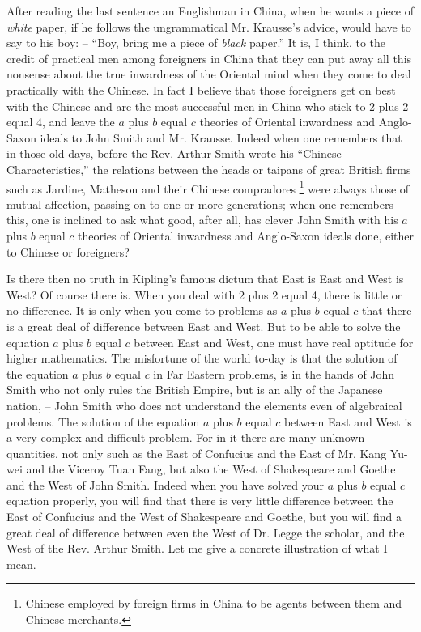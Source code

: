 After reading the last sentence an Englishman in China,
when he wants a piece of \emph{white} paper,
if he follows the ungrammatical Mr. Krausse's advice, would have to say to his boy: --
``Boy, bring me a piece of \emph{black} paper.''
It is, I think, to the credit of practical men among foreigners in China
that they can put away all this nonsense about the true inwardness of the Oriental mind
when they come to deal practically with the Chinese.
In fact I believe that those foreigners get on best with the Chinese and
are the most successful men in China who stick to 2 plus 2 equal 4,
and leave the $a$ plus $b$ equal $c$ theories of Oriental inwardness
and Anglo-Saxon ideals to John Smith and Mr. Krausse.
Indeed when one remembers that in those old days,
before the Rev. Arthur Smith wrote his ``Chinese Characteristics,''
the relations between the heads or taipans of great British
firms such as Jardine, Matheson and their Chinese compradores
\footnote{Chinese employed by foreign firms in China to be agents between them and Chinese merchants.}
were always those of mutual affection, passing on to one or more generations;
when one remembers this, one is inclined to ask what good,
after all, has clever John Smith with his $a$ plus $b$ equal $c$ theories of Oriental inwardness 
and Anglo-Saxon ideals done, either to Chinese or foreigners?

Is there then no truth in Kipling's famous dictum that East is East and West is West?
Of course there is. When you deal with 2 plus 2 equal 4, there is little or no difference.
It is only when you come to problems as $a$ plus $b$ equal $c$
that there is a great deal of difference between East and West.
But to be able to solve the equation $a$ plus $b$ equal $c$ between East and West,
one must have real aptitude for higher mathematics.
The misfortune of the world to-day is that the solution of the equation
$a$ plus $b$ equal $c$ in Far Eastern problems,
is in the hands of John Smith who not only rules the British Empire,
but is an ally of the Japanese nation,
-- John Smith who does not understand the elements even of algebraical problems.
The solution of the equation $a$ plus $b$ equal $c$ between East and West
is a very complex and difficult problem.
For in it there are many unknown quantities,
not only such as the East of Confucius and the East of Mr. Kang Yu-wei and the Viceroy Tuan Fang,
but also the West of Shakespeare and Goethe and the West of John Smith.
Indeed when you have solved your $a$ plus $b$ equal $c$ equation properly,
you will find that there is very little difference
between the East of Confucius and the West of Shakespeare and Goethe,
but you will find a great deal of difference between even the West of Dr. Legge the scholar,
and the West of the Rev. Arthur Smith.
Let me give a concrete illustration of what I mean.

